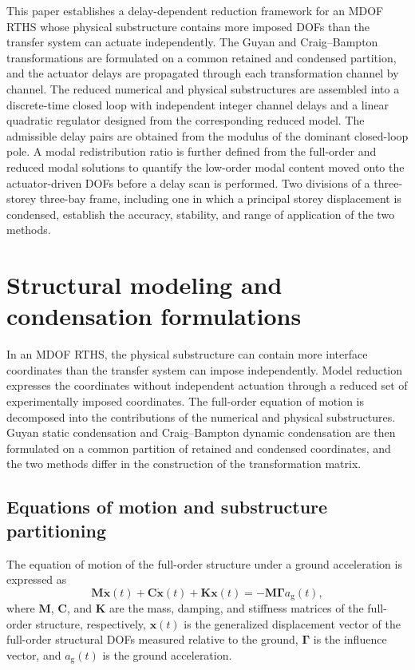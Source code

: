 \documentclass[a4paper,fleqn,review,12pt]{cas-sc}
\numberwithin{equation}{section}
\begin{document}
This paper establishes a delay-dependent reduction framework for an MDOF RTHS whose physical substructure contains more imposed DOFs than the transfer system can actuate independently. The Guyan and Craig--Bampton transformations are formulated on a common retained and condensed partition, and the actuator delays are propagated through each transformation channel by channel. The reduced numerical and physical substructures are assembled into a discrete-time closed loop with independent integer channel delays and a linear quadratic regulator designed from the corresponding reduced model. The admissible delay pairs are obtained from the modulus of the dominant closed-loop pole. A modal redistribution ratio is further defined from the full-order and reduced modal solutions to quantify the low-order modal content moved onto the actuator-driven DOFs before a delay scan is performed. Two divisions of a three-storey three-bay frame, including one in which a principal storey displacement is condensed, establish the accuracy, stability, and range of application of the two methods.

\section{Structural modeling and condensation formulations} \label{sec2}

In an MDOF RTHS, the physical substructure can contain more interface coordinates than the transfer system can impose independently. Model reduction expresses the coordinates without independent actuation through a reduced set of experimentally imposed coordinates. The full-order equation of motion is decomposed into the contributions of the numerical and physical substructures. Guyan static condensation and Craig--Bampton dynamic condensation are then formulated on a common partition of retained and condensed coordinates, and the two methods differ in the construction of the transformation matrix.

\subsection{Equations of motion and substructure partitioning}

The equation of motion of the full-order structure under a ground acceleration is expressed as
\begin{equation}
  \mathbf{M}\ddot{\bm{x}}(t)+\mathbf{C}\dot{\bm{x}}(t)+\mathbf{K}\bm{x}(t)
  =-\mathbf{M}\bm{\Gamma}a_{\mathrm{g}}(t),
  \label{eq:full-order-eom}
\end{equation}
where \(\mathbf{M}\), \(\mathbf{C}\), and \(\mathbf{K}\) are the mass, damping, and stiffness matrices of the full-order structure, respectively, \(\bm{x}(t)\) is the generalized displacement vector of the full-order structural DOFs measured relative to the ground, \(\bm{\Gamma}\) is the influence vector, and \(a_{\mathrm{g}}(t)\) is the ground acceleration.
\end{document}
